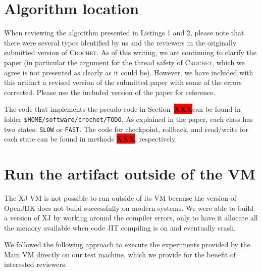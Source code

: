 \documentclass[12pt]{article}
\newcommand{\vm}[1]{\colorbox{green!20}{\texttt{\color{black}#1}}}
\newcommand{\XXX}{\colorbox{red}{\bf\color{white}XXX}}
\newcommand{\sysname}{\textsc{Crochet}\xspace}
\begin{document}
\section{Algorithm location}
\label{sec:algorithm}

When reviewing the algorithm presented in Listings 1 and 2, please note that there were several typos identified by us and the reviewers in the originally submitted version of \sysname. As of this writing, we are continuing to clarify the paper (in particular the argument for the thread safety of \sysname, which we agree is not presented as clearly as it could be). However, we have included with this artifact a revised version of the submitted paper with some of the errors corrected. Please use the included version of the paper for reference.

The code that implements the pseudo-code in Section~\XXX can be found in folder
\vm{\$HOME/software/crochet/TODO}.  As explained in the paper, each class
has two states:  \texttt{SLOW} or \texttt{FAST}.  The code for checkpoint,
rollback, and read/write for each state can be found in methods \XXX,
respectively.

\section{Run the artifact outside of the VM}
\label{sec:extract}
\label{sec:last}

The XJ VM is not possible to run outside of its VM because the version of
OpenJDK does not build successfully on modern systems.  We were able to build a
version of XJ by working around the compiler errors, only to have it allocate
all the memory available when code JIT compiling is on and eventually crash.

We followed the following approach to execute the experiments provided by the
Main VM directly on our test machine, which we provide for the benefit of interested reviewers:
\end{document}
